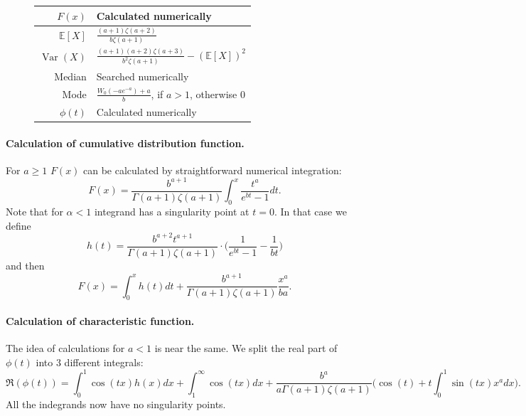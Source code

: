 \documentclass[a4paper,11pt]{article}
\theoremstyle{plain}
\theoremstyle{definition}
\newcommand{\ME}{\mathbb{E}}
\newcommand{\Var}{\operatorname{Var}}
\begin{document}
\begin{figure}[!htb]
\begin{minipage}{0.4\textwidth}
\begin{tabular}{| r | l |}
			\hline
			$F(x)$ & Calculated numerically \\
			\hline
			$\ME[X]$ & $ \frac{(a+1)\zeta(a+2)}{b \zeta(a+1)}$ \\
			\hline
			$\Var(X)$ & $\frac{(a+1)(a+2)\zeta(a+3)}{b^2 \zeta(a+1)}  - (\ME[X])^2$ \\
			\hline
			Median & Searched numerically \\
			\hline
			Mode & $\frac{W_0(-a e^{-a}) + a}{b}$, if $a > 1$, otherwise $0$ \\
			\hline
			$\phi(t)$ & Calculated numerically \\
			\hline
		\end{tabular}
	\end{minipage}
    \end{figure}
    \paragraph{Calculation of cumulative distribution function.} For $a \geq 1$ $F(x)$ can be calculated by straightforward numerical integration:
    \[
    F(x) = \frac{b^{a+1}}{\Gamma(a+1)\zeta(a+1)} \int_{0}^{x} \frac{t ^ a}{e^{bt} - 1} dt.
    \]
    Note that for $\alpha < 1$ integrand has a singularity point at $t=0$. In that case we define
    \[
    h(t) = \frac{b^{a+2}t ^ {a+1} }{\Gamma(a+1)\zeta(a+1)} \cdot \bigg( \frac{1}{e^{bt} -  1}-\frac{1}{bt}\bigg)
    \]
    and then
    \[
    F(x) = \int_{0}^{x}  h(t) dt + \frac{b^{a+1}}{\Gamma(a+1)\zeta(a+1)} \frac{x^a}{ba}.
    \]
	
	\paragraph{Calculation of characteristic function.} The idea of calculations for $a < 1$ is near the same. We split the real part of $\phi(t)$ into $3$ different integrals:
	\[
	\Re(\phi(t)) = \int_{0}^{1} \cos(tx) h(x) dx + \int_{1}^{\infty} \cos(tx) dx + \frac{b^{a}}{a\Gamma(a+1)\zeta(a+1)} \bigg(\cos(t) + t\int_{0}^{1} \sin(tx)x^a dx \bigg).
	\]
	All the indegrands now have no singularity points.
	
	\pagebreak
\end{document}
